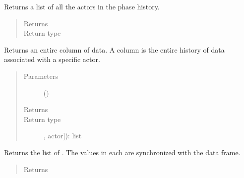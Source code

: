 \documentclass[letterpaper,10pt,openany,oneside,english]{sphinxmanual}
\begin{document}
\begin{fulllineitems}
\begin{fulllineitems}
\end{fulllineitems}


\begin{fulllineitems}
\label{\detokenize{support_rst/phase:phase.Phase.GetActors}}
Returns a list of all the actors in the phase history.
\begin{quote}\begin{description}
\item[{Returns}] \leavevmode
{}

\item[{Return type}] \leavevmode
{}

\end{description}\end{quote}

\end{fulllineitems}


\begin{fulllineitems}
\label{\detokenize{support_rst/phase:phase.Phase.GetColumn}}
Returns an entire column of data. A column is the entire history
of data associated with a specific actor.
\begin{quote}\begin{description}
\item[{Parameters}] \leavevmode
{} () \textendash{} 

\item[{Returns}] \leavevmode
\sphinxstylestrong{list(self.\_\_phase.loc{[}}

\item[{Return type}] \leavevmode
, actor{]}): list

\end{description}\end{quote}

\end{fulllineitems}


\begin{fulllineitems}
\label{\detokenize{support_rst/phase:phase.Phase.GetQuantities}}
Returns the list of . The values in each  are
synchronized with the  data frame.
\begin{quote}\begin{description}
\item[{Returns}] \leavevmode
{}


\end{description}
\end{quote}
\end{fulllineitems}
\end{fulllineitems}
\end{document}
